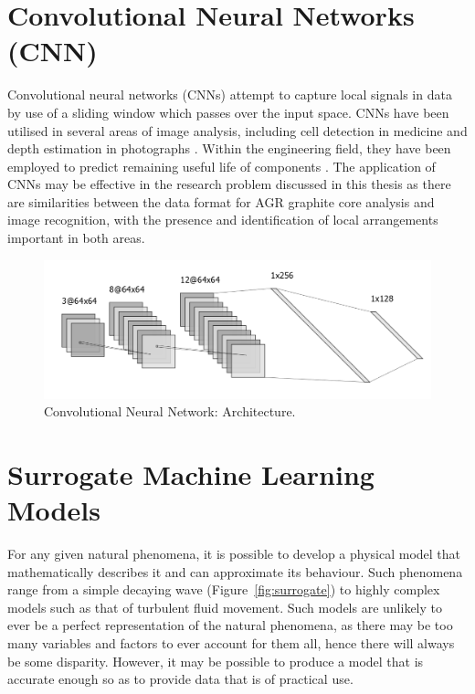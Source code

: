 \section{Convolutional Neural Networks (CNN)} \label{convolution}

Convolutional neural networks (CNNs) attempt to capture local signals in data by use of a sliding window which passes over the input space. CNNs have been utilised in several areas of image analysis, including cell detection in medicine \cite{xie2015beyond} and depth estimation in photographs \cite{li2015depth}. Within the engineering field, they have been employed to predict remaining useful life of components \cite{babu2016deep}. The application of CNNs may be effective in the research problem discussed in this thesis as there are similarities between the data format for AGR graphite core analysis and image recognition, with the presence and identification of local arrangements important in both areas.
\\

\begin{figure}[p]
	\centering
	\includegraphics[scale=0.45]{Figures/cnn_arch.png}
	\caption{Convolutional Neural Network: Architecture.}
	\label{fig:cnn}
\end{figure}

\section{Surrogate Machine Learning Models} \label{Surrogate}

For any given natural phenomena, it is possible to develop a physical model that mathematically describes it and can approximate its behaviour. Such phenomena range from a simple decaying wave (Figure~\ref{fig:surrogate}) to highly complex models such as that of turbulent fluid movement. Such models are unlikely to ever be a perfect representation of the natural phenomena, as there may be too many variables and factors to ever account for them all, hence there will always be some disparity. However, it may be possible to produce a model that is accurate enough so as to provide data that is of practical use.
\\

